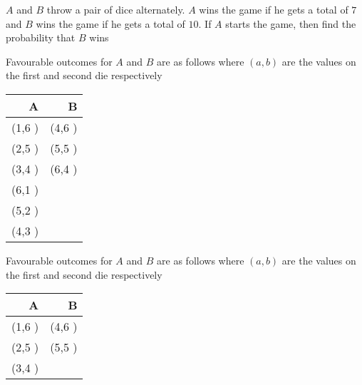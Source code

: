 \documentclass[14pt,fleqn]{extarticle}
\begin{document}
 
\begin{question}
	\statement 
    
    $A$ and $B$ throw a pair of dice alternately. 
    $A$ wins the game if he gets a total of $7$ and $B$ wins the game if 
    he gets a total of $10$. If $A$ starts the game, then find the 
    probability that $B$ wins

    \begin{step}
  \begin{options} 
     \correct 
      
      Favourable outcomes for $A$ and $B$ are as follows where 
      $\left(a,b \right)$ are the 
      values on the first and second die respectively 
      
      \begin{center}
  \begin{tabular}{NN}
   \toprule
        A & B \\
   \midrule 
   \left(1,6 \right) & \left(4,6 \right) \\
    \midrule 
    \left(2,5 \right) & \left(5,5 \right) \\
    \midrule 
    \left(3,4 \right) & \left(6,4 \right) \\
    \midrule
    \left(6,1 \right) & \\
    \midrule
    \left(5,2 \right) & \\
    \midrule
    \left(4,3 \right) & \\
    \bottomrule
  \end{tabular}
\end{center}

     \incorrect
     
     Favourable outcomes for $A$ and $B$ are as follows where 
      $\left(a,b \right)$ are the 
      values on the first and second die respectively 
      
      \begin{center}
  \begin{tabular}{NN}
   \toprule
        A & B \\
   \midrule 
   \left(1,6 \right) & \left(4,6 \right) \\
    \midrule 
    \left(2,5 \right) & \left(5,5 \right) \\
    \midrule 
    \left(3,4 \right) & \\
    \bottomrule
  \end{tabular}
\end{center}
        
    \end{options} 
     \reason 
     

\end{step}
\end{question}
\end{document}
